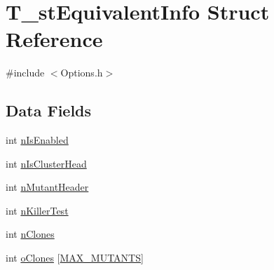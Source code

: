 \hypertarget{structT__stEquivalentInfo}{\section{T\-\_\-st\-Equivalent\-Info Struct Reference}
\label{structT__stEquivalentInfo}
}


{\ttfamily \#include $<$Options.\-h$>$}

\subsection*{Data Fields}
\begin{DoxyCompactItemize}
\item 
int \hyperlink{structT__stEquivalentInfo_ab185268073e2e8714a8b9fdb1358a45b}{n\-Is\-Enabled}
\item 
int \hyperlink{structT__stEquivalentInfo_a427c3bc03f8f3e7663a711aa3434c3d9}{n\-Is\-Cluster\-Head}
\item 
int \hyperlink{structT__stEquivalentInfo_a06d3ffe5f363720e93e18c063aa51f63}{n\-Mutant\-Header}
\item 
int \hyperlink{structT__stEquivalentInfo_aa4853fe37591edc1635ed1ee395b3cbc}{n\-Killer\-Test}
\item 
int \hyperlink{structT__stEquivalentInfo_ad201086ca20481fdbc1582c44a2ef6e1}{n\-Clones}
\item 
int \hyperlink{structT__stEquivalentInfo_ae417176f3e5f8dc22daf5a2f7b931d78}{o\-Clones} \mbox{[}\hyperlink{Options_8h_a7b5fa9fc08e6e43e329c804ac562bd00}{M\-A\-X\-\_\-\-M\-U\-T\-A\-N\-T\-S}\mbox{]}
\end{DoxyCompactItemize}


